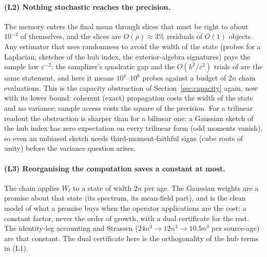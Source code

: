 \paragraph{(L2) Nothing stochastic reaches the precision.} The memory enters the final mean through slices that must
be right to about $10^{-2}$ of themselves, and the slices are $O(\rho)\approx3\%$ residuals of $O(1)$ objects.
Any estimator that uses randomness to avoid the width of the state (probes for a Laplacian, sketches of the hub
index, the exterior-algebra signatures) pays the sample law $\varepsilon^{-2}$: the samplizer's quadratic gap and
the $O(k^2/\varepsilon^2)$ trials of \cite{ext} are the same statement, and here it means $10^{4}$--$10^{6}$
probes against a budget of $2n$ chain evaluations. This is the capacity obstruction of Section~\ref{sec:capacity}
again, now with its lower bound: coherent (exact) propagation costs the width of the state and no variance; sample
access costs the square of the precision. For a trilinear readout the obstruction is sharper than for a bilinear
one: a Gaussian sketch of the hub index has zero expectation on every trilinear form (odd moments vanish), so even
an unbiased sketch needs third-moment-faithful signs (cube roots of unity) before the variance question arises.

\paragraph{(L3) Reorganising the computation saves a constant at most.} The chain applies $W_l$ to a state of width
$2n$ per age. The Gaussian weights are a promise about that state (its spectrum, its mean-field part), and
\cite{LdW} is the clean model of what a promise buys when the operator applications are the cost: a constant
factor, never the order of growth, with a dual certificate for the rest. The identity-leg accounting and
Strassen ($24n^3\to12n^3\to10.5n^3$ per source-age) are that constant. The dual certificate here is the
orthogonality of the hub terms in (L1).

